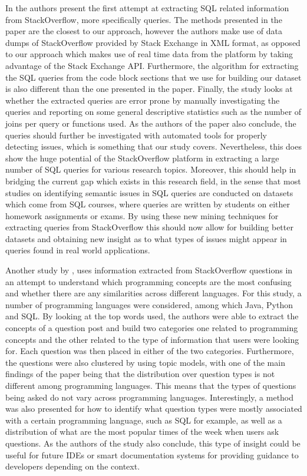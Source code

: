 In \citet{P018} the authors present the first attempt at extracting SQL related information from StackOverflow, more specifically queries. The methods presented in the paper are the closest to our approach, however the authors make use of data dumps of StackOverflow provided by Stack Exchange in XML format, as opposed to our approach which makes use of real time data from the platform by taking advantage of the Stack Exchange API. Furthermore, the algorithm for extracting the SQL queries from the code block sections that we use for building our dataset is also different than the one presented in the paper. Finally, the study looks at whether the extracted queries are error prone by manually investigating the queries and reporting on some general descriptive statistics such as the number of joins per query or functions used. As the authors of the paper also conclude, the queries should further be investigated with automated tools for properly detecting issues, which is something that our study covers. Nevertheless, this does show the huge potential of the StackOverflow platform in extracting a large number of SQL queries for various research topics. Moreover, this should help in bridging the current gap which exists in this research field, in the sense that most studies on identifying semantic issues in SQL queries are conducted on datasets which come from SQL courses, where queries are written by students on either homework assignments or exams. By using these new mining techniques for extracting queries from StackOverflow this should now allow for building better datasets and obtaining new insight as to what types of issues might appear in queries found in real world applications.

Another study by \citet{P020}, uses information extracted from StackOverflow questions in an attempt to understand which programming concepts are the most confusing and whether there are any similarities across different languages. For this study, a number of programming languages were considered, among which Java, Python and SQL. By looking at the top words used, the authors were able to extract the concepts of a question post and build two categories one related to programming concepts and the other related to the type of information that users were looking for. Each question was then placed in either of the two categories. Furthermore, the questions were also clustered by using topic models, with one of the main findings of the paper being that the distribution over question types is not different among programming languages. This means that the types of questions being asked do not vary across programming languages. Interestingly, a method was also presented for how to identify what question types were mostly associated with a certain programming language, such as SQL for example, as well as a distribution of what are the most popular times of the week when users ask questions. As the authors of the study also conclude, this type of insight could be useful for future IDEs or smart documentation systems for providing guidance to developers depending on the context.

